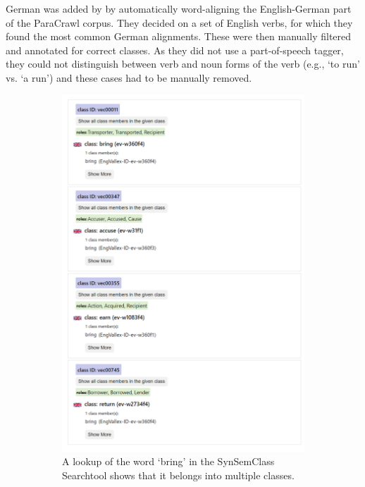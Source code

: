 German was added by \citet{uresova-etal-2022-making} by automatically word-aligning the English-German part of the ParaCrawl \parencite{banon-etal-2020-paracrawl} corpus. They decided on a set of English verbs, for which they found the most common German alignments. These were then manually filtered and annotated for correct classes. As they did not use a part-of-speech tagger, they could not distinguish between verb and noun forms of the verb (e.g., `to run' vs. `a run') and these cases had to be manually removed.

\begin{figure}[t]
\centering
\begin{subfigure}[t]{0.49\textwidth}
\centering
\includegraphics[width=0.9\linewidth]{img/synsemclass_tool}
\caption{A lookup of the word `bring' in the SynSemClass Search\footnotemark tool shows that it belongs into multiple classes.}
\label{fig:synsemclass-search}
\end{subfigure}\hfill
\begin{subfigure}[t]{0.49\textwidth}

\end{subfigure}
\end{figure}

